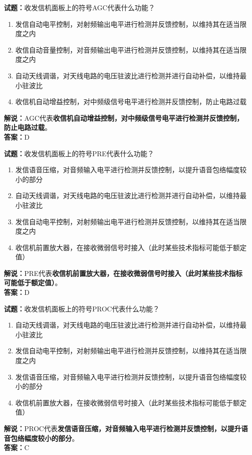 \documentclass{ctexbook}
\begin{document}
\vspace{1em}

\textbf{试题：}收发信机面板上的符号AGC代表什么功能？
\begin{enumerate}[leftmargin=3em]
  \item 发信自动电平控制，对射频输出电平进行检测并反馈控制，以维持其在适当限度之内
  \item 收信自动音量控制，对音频输出电平进行检测并反馈控制，以维持其在适当限度之内
  \item 自动天线调谐，对天线电路的电压驻波比进行检测并进行自动补偿，以维持最小驻波比
  \item 收信机自动增益控制，对中频级信号电平进行检测并反馈控制，防止电路过载
\end{enumerate}
\noindent\textbf{解说：}AGC代表\textbf{收信机自动增益控制，对中频级信号电平进行检测并反馈控制，防止电路过载}。\\\noindent\textbf{答案：}D

\vspace{1em}

\textbf{试题：}收发信机面板上的符号PRE代表什么功能？
\begin{enumerate}[leftmargin=3em]
  \item 发信语音压缩，对音频输入电平进行检测并反馈控制，以提升语音包络幅度较小的部分
  \item 自动天线调谐，对天线电路的电压驻波比进行检测并进行自动补偿，以维持最小驻波比
  \item 发信自动电平控制，对射频输出电平进行检测并反馈控制，以维持其在适当限度之内
  \item 收信机前置放大器，在接收微弱信号时接入（此时某些技术指标可能低于额定值）
\end{enumerate}
\noindent\textbf{解说：}PRE代表\textbf{收信机前置放大器，在接收微弱信号时接入（此时某些技术指标可能低于额定值）}。\\\noindent\textbf{答案：}D

\vspace{1em}

\textbf{试题：}收发信机面板上的符号PROC代表什么功能？
\begin{enumerate}[leftmargin=3em]
  \item 自动天线调谐，对天线电路的电压驻波比进行检测并进行自动补偿，以维持最小驻波比
  \item 发信自动电平控制，对射频输出电平进行检测并反馈控制，以维持其在适当限度之内
  \item 发信语音压缩，对音频输入电平进行检测并反馈控制，以提升语音包络幅度较小的部分
  \item 收信机前置放大器，在接收微弱信号时接入（此时某些技术指标可能低于额定值）
\end{enumerate}
\noindent\textbf{解说：}PROC代表\textbf{发信语音压缩，对音频输入电平进行检测并反馈控制，以提升语音包络幅度较小的部分}。\\\noindent\textbf{答案：}C
\end{document}
